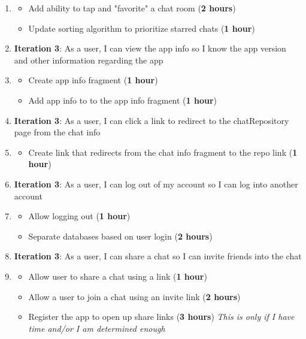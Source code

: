\documentclass{report}
\begin{document}
\begin{enumerate}
    \item[] \begin{itemize}
    \item Add ability to tap and "favorite" a chat room (\textbf{2 hours})
        \item Update sorting algorithm to prioritize starred chats (\textbf{1 hour})
    \end{itemize}
    \item \textbf{Iteration 3}: As a user, I can view the app info so I know the app version and other information regarding the app
    \item[] \begin{itemize}
        \item Create app info fragment (\textbf{1 hour})
        \item Add app info to to the app info fragment (\textbf{1 hour})
    \end{itemize}
    \item \textbf{Iteration 3}: As a user, I can click a link to redirect to the chatRepository page from the chat info
    \item[] \begin{itemize}
        \item Create link that redirects from the chat info fragment to the repo link (\textbf{1 hour})
    \end{itemize}
    \item \textbf{Iteration 3}: As a user, I can log out of my account so I can log into another account
    \item[]\begin{itemize}
        \item Allow logging out (\textbf{1 hour})
        \item Separate databases based on user login (\textbf{2 hours})
    \end{itemize}
    \item \textbf{Iteration 3}: As a user, I can share a chat so I can invite friends into the chat
    \item[] \begin{itemize}
        \item Allow user to share a chat using a link (\textbf{1 hour})
        \item Allow a user to join a chat using an invite link (\textbf{2 hours})
        \item Register the app to open up share links (\textbf{3 hours}) \textit{This is only if I have time and/or I am determined enough}
    \end{itemize}
\end{enumerate}
\end{document}
